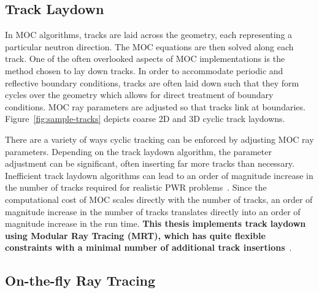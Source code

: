 \documentclass[12pt,twoside]{mitthesis-exec}
\begin{document}

\subsection*{Track Laydown}

In MOC algorithms, tracks are laid across the geometry, each representing a particular neutron direction. The MOC equations are then solved along each track. One of the often overlooked aspects of MOC implementations is the method chosen to lay down tracks. In order to accommodate periodic and reflective boundary conditions, tracks are often laid down such that they form cycles over the geometry which allows for direct treatment of boundary conditions. MOC ray parameters are adjusted so that tracks link at boundaries. Figure~\ref{fig:sample-tracks} depicts coarse 2D and 3D cyclic track laydowns.


There are a variety of ways cyclic tracking can be enforced by adjusting MOC ray parameters. Depending on the track laydown algorithm, the parameter adjustment can be significant, often inserting far more tracks than necessary. Inefficient track laydown algorithms can lead to an order of magnitude increase in the number of tracks required for realistic PWR problems~\cite{shaner-laydown}. Since the computational cost of MOC scales directly with the number of tracks, an order of magnitude increase in the number of tracks translates directly into an order of magnitude increase in the run time. \textbf{This thesis implements track laydown using Modular Ray Tracing (MRT), which has quite flexible constraints with a minimal number of additional track insertions}~\cite{liu_mrt}.


\subsection*{On-the-fly Ray Tracing}
\end{document}
